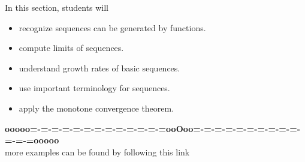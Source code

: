 \documentclass{ximera}
\begin{document}
\begin{sectionOutcomes}

In this section, students will

\begin{itemize}
\item{recognize sequences can be generated by functions.}
\item{compute limits of sequences.}
\item{understand growth rates of basic sequences.}
\item{use important terminology for sequences.}
\item{apply the monotone convergence theorem.}
\end{itemize}

\end{sectionOutcomes}


















\begin{center}
\textbf{\textcolor{green!50!black}{ooooo=-=-=-=-=-=-=-=-=-=-=-=-=ooOoo=-=-=-=-=-=-=-=-=-=-=-=-=ooooo}} \\

more examples can be found by following this link\\ 

\end{center}
\end{document}
